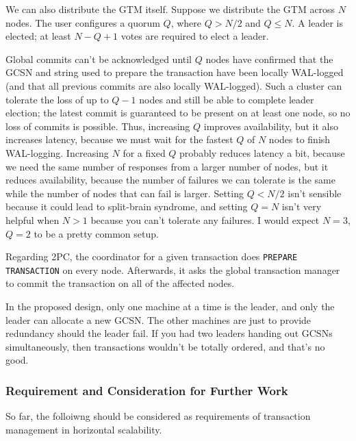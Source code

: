 	We can also distribute the GTM itself. Suppose we distribute the GTM across $N$ nodes.
	The user configures a quorum $Q$, where $Q > N/2$ and $Q \le N$.
	A leader is elected; at least $N - Q + 1$ votes are required to elect a leader. 

	Global commits can't be acknowledged until $Q$ nodes have confirmed that the GCSN and
	string used to prepare the transaction have been locally WAL-logged
	(and that all previous commits are also locally WAL-logged).
	Such a cluster can tolerate the loss of up to $Q - 1$ nodes and still be able to
	complete leader election; the latest commit is guaranteed to be present on at least
	one node, so no loss of commits is possible.
	Thus, increasing $Q$ improves availability, but it also increases latency,
	because we must wait for the fastest $Q$ of $N$ nodes to finish WAL-logging.
	Increasing $N$ for a fixed $Q$ probably reduces latency a bit, because we need
	the same number of responses from a larger number of nodes, but it reduces
	availability, because the number of failures we can tolerate is the same while
	the number of nodes that can fail is larger.
	Setting $Q < N/2$ isn't sensible because it could lead to split-brain syndrome,
	and setting $Q = N$ isn't very helpful when $N > 1$ because you can't tolerate
	any failures.
	I would expect $N = 3$, $Q = 2$ to be a pretty common setup.

	Regarding 2PC, the coordinator for a given transaction does \texttt{PREPARE TRANSACTION}
	on every node.
	Afterwards, it asks the global transaction manager to commit the transaction on all of
	the affected nodes.
	
	In the proposed design, only one machine at a time is the leader, and only the leader
	can allocate a new GCSN.
	The other machines are just to provide redundancy should the leader fail.
	If you had two leaders handing out GCSNs simultaneously, then transactions wouldn't
	be totally ordered, and that's no good.



\subsubsection{Requirement and Consideration for Further Work}

	So far, the folloiwng should be considered as requirements of transaction management
	in horizontal scalability.


